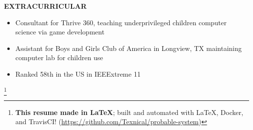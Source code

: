 \documentclass[letterpaper]{article}
\newcommand{\altsection}[1]{\noindent\textbf{#1}\smallskip}
\newcommand{\entry}[3]{\textbf{#1}, #2\begin{itemize}[leftmargin=3.5em]#3\end{itemize}\bigskip}
\newcommand\eol[1]{%
    \begingroup
    \renewcommand\thefootnote{}\footnote{#1}%
    \addtocounter{footnote}{-1}%
    \endgroup
}
\begin{document}

\altsection{EXTRACURRICULAR}

\begin{itemize}[leftmargin=3.5em]
\item Consultant for Thrive 360, teaching underprivileged children computer science via game development
\item Assistant for Boys and Girls Club of America in Longview, TX maintaining computer lab for children use
\item Ranked 58th in the US in IEEExtreme 11
\end{itemize}

\eol{\noindent\textbf{This resume made in \LaTeX{}}; built and automated with \LaTeX{}, Docker, and TravisCI! (\url{https://github.com/Texnical/probable-system})}
\end{document}
